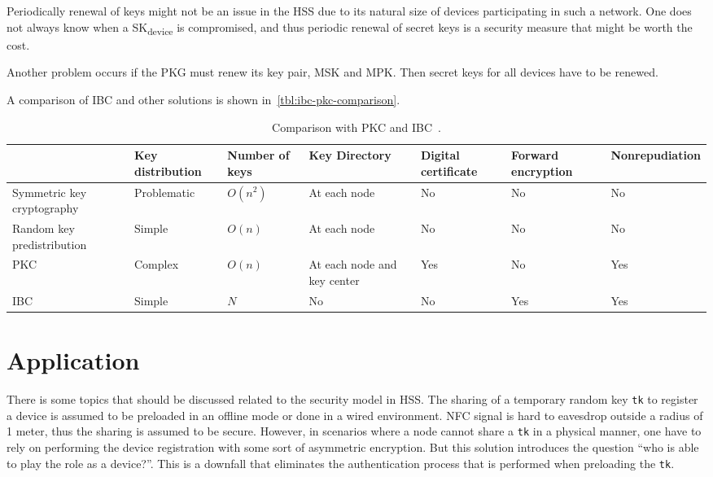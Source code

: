 Periodically renewal of keys might not be an issue in the \gls{HSS} due to its natural size of devices participating in such a network.
One does not always know when a SK\textsubscript{device} is compromised, and thus periodic renewal of secret keys is a security measure that might be worth the cost.

Another problem occurs if the \gls{PKG} must renew its key pair, \gls{MSK} and \gls{MPK}.
Then secret keys for all devices have to be renewed.

A comparison of \gls{IBC} and other solutions is shown in~\autoref{tbl:ibc-pkc-comparison}.
\begin{table}[h]\footnotesize
  \begin{tabular}[c]{ | p{2cm} | p{1.5cm} | p{1cm} | p{1.2cm} | p{1cm} | p{1.3cm} | p{1.8cm} |}
  \hline 
  & Key distribution & Number of keys & Key Directory & Digital certificate & Forward encryption & Nonrepudiation 	\\ \hline
  Symmetric key cryptography 	& Problematic 	& $O(n^2)$ 	& At each node 					& No 	& No 	& No 	\\ \hline 
  Random key predistribution 	& Simple 		& $O(n)$ 	& At each node 					& No 	& No 	& No 	\\ \hline
  PKC 							& Complex 		& $O(n)$ 	& At each node and key center 	& Yes 	& No 	& Yes 	\\ \hline
  IBC 							& Simple 		& $N$ 		& No 							& No 	& Yes 	& Yes 	\\ \hline
  \end{tabular}
  \caption[Comparison with PKC and IBC]{Comparison with PKC and IBC~\cite[Table 9.6]{Patil:2012:SWS:2464778}.}
  \label{tbl:ibc-pkc-comparison}
\end{table}

\section{Application}
There is some topics that should be discussed related to the security model in \gls{HSS}.
The sharing of a temporary random key \texttt{tk} to register a device is assumed to be preloaded in an offline mode or done in a wired environment. 
\gls{NFC} signal is hard to eavesdrop outside a radius of 1 meter, thus the sharing is assumed to be secure.
However, in scenarios where a node cannot share a \texttt{tk} in a physical manner, one have to rely on performing the device registration with some sort of asymmetric encryption. 
But this solution introduces the question ``who is able to play the role as a device?''.
This is a downfall that eliminates the authentication process that is performed when preloading the \texttt{tk}.


